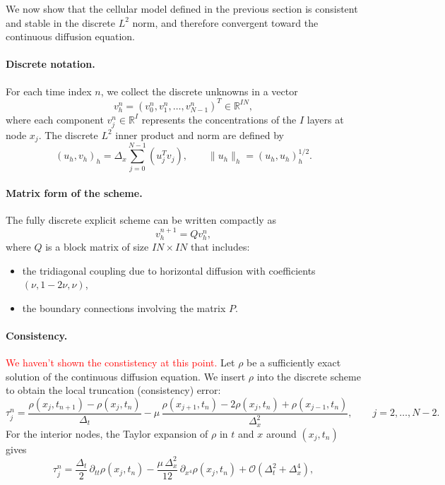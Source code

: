 \documentclass{article}
\begin{document}
We now show that the cellular model defined in the previous section is consistent and stable in the discrete $L^2$ norm, and therefore convergent toward the continuous diffusion equation.

\paragraph{Discrete notation.}

For each time index $n$, we collect the discrete unknowns in a vector
\[
v_h^n = (v_0^n, v_1^n, \ldots, v_{N-1}^n)^T \in \mathbb{R}^{I N},
\]
where each component $v_j^n \in \mathbb{R}^I$ represents the concentrations of the $I$ layers at node $x_j$.
The discrete $L^2$ inner product and norm are defined by
\[
(u_h, v_h)_h = \Delta_x \sum_{j=0}^{N-1} (u_j^T v_j), \qquad
\|u_h\|_h = (u_h, u_h)_h^{1/2}.
\]

\paragraph{Matrix form of the scheme.}
The fully discrete explicit scheme can be written compactly as
\begin{equation}\label{eq:matrix_scheme}
v_h^{n+1} = Q v_h^n,
\end{equation}
where $Q$ is a block matrix of size $IN\times IN$ that includes:
\begin{itemize}
  \item the tridiagonal coupling due to horizontal diffusion with coefficients $(\nu, 1-2\nu, \nu)$,
  \item the boundary connections involving the matrix $P$.
\end{itemize}

\paragraph{Consistency.} 
\textcolor{red}{We haven't shown the constistency at this point.}
Let $\rho$ be a sufficiently exact solution of the continuous diffusion equation.  
We insert $\rho$ into the discrete scheme to obtain the local truncation (consistency) error:
\[
\tau_j^n =
\frac{\rho(x_j, t_{n+1}) - \rho(x_j, t_n)}{\Delta_t}
- \mu\,\frac{\rho(x_{j+1}, t_n) - 2\rho(x_j, t_n) + \rho(x_{j-1}, t_n)}{\Delta_x^2},
\qquad j = 2, \dots, N-2.
\]
For the interior nodes, the Taylor expansion of $\rho$ in $t$ and $x$ around $(x_j,t_n)$ gives
\begin{equation}
\tau_j^n = 
\frac{\Delta_t}{2}\,\partial_{tt}\rho(x_j, t_n)
- \frac{\mu\,\Delta_x^2}{12}\,\partial_{x^4}\rho(x_j, t_n)
+ \mathcal{O}(\Delta_t^2 + \Delta_x^4), \tag{*}
\end{equation}
\end{document}
